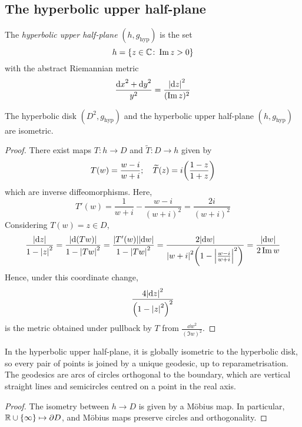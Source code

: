 \subsection{The hyperbolic upper half-plane}
\begin{definition}
	The \textit{hyperbolic upper half-plane} \( (h,g_{\text{hyp}}) \) is the set
	\[ h = \qty{z \in \mathbb C \colon \Im z > 0} \]
	with the abstract Riemannian metric
	\[ \frac{\dd{x}^2 + \dd{y}^2}{y^2} = \frac{\abs{\dd{z}}^2}{(\Im z)^2} \]
\end{definition}
\begin{lemma}
	The hyperbolic disk \( (D^2, g_{\text{hyp}}) \) and the hyperbolic upper half-plane \( (h,g_{\text{hyp}}) \) are isometric.
\end{lemma}
\begin{proof}
	There exist maps \( T \colon h \to D \) and \( \widetilde T \colon D \to h \) given by
	\[ T(w) = \frac{w-i}{w+i};\quad \widetilde T(z) = i\qty(\frac{1-z}{1+z}) \]
	which are inverse diffeomorphisms.
	Here,
	\[ T'(w) = \frac{1}{w+i} - \frac{w-i}{(w+i)^2} = \frac{2i}{(w+i)^2} \]
	Considering \( T(w) = z \in D \),
	\[ \frac{\abs{\dd{z}}}{1-\abs{z}^2} = \frac{\abs{\dd{(Tw)}}}{1-\abs{T w}^2} = \frac{\abs{T'(w)} \abs{\dd{w}}}{1-\abs{Tw}^2} = \frac{2 \abs{\dd{w}}}{\abs{w+i}^2 \qty(1 - \abs{\frac{w-i}{w+i}}^2)} = \frac{\abs{\dd{w}}}{2\Im w} \]
	Hence, under this coordinate change,
	\[ \frac{4 \abs{\dd{z}}^2}{\qty(1 - \abs{z}^2)^2} \]
	is the metric obtained under pullback by \( T \) from \( \frac{\dd{w}^2}{(\Im w)^2} \).
\end{proof}
\begin{corollary}
	In the hyperbolic upper half-plane, it is globally isometric to the hyperbolic disk, so every pair of points is joined by a unique geodesic, up to reparametrisation.
	The geodesics are arcs of circles orthogonal to the boundary, which are vertical straight lines and semicircles centred on a point in the real axis.
\end{corollary}
\begin{proof}
	The isometry between \( h \to D \) is given by a M\"obius map.
	In particular, \( \mathbb R \cup \qty{\infty} \mapsto \partial D \), and M\"obius maps preserve circles and orthogonality.
\end{proof}
